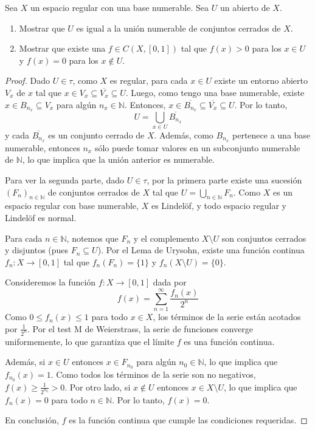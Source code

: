 \documentclass{article}
\theoremstyle{plain}
\theoremstyle{definition}
\newcommand{\N}{\mathbb{N}}
\newcommand{\cl}[1]{\overline{#1}}              %
\newenvironment{ejercicio}[1]{\begin{trivlist}
\item[\hskip \labelsep {\bfseries Ejercicio}\hskip \labelsep {\bfseries #1.}]}{\end{trivlist}}
\begin{document}
\begin{ejercicio}{5}
    Sea \( X \) un espacio regular con una base numerable. Sea \( U \) un abierto de \( X \).
    \begin{enumerate}
        \item Mostrar que \( U \) es igual a la unión numerable de conjuntos cerrados de \( X \).
        \item Mostrar que existe una \( f \in C(X, [0,1]) \) tal que \( f(x) > 0 \) para los \( x \in U \) y \( f(x) = 0 \) para los \( x \notin U \).
    \end{enumerate}
\end{ejercicio}
\begin{proof}
    Dado \( U \in \tau \), como \( X \) es regular, para cada \( x \in U \) existe un entorno abierto \( V_x \) de \( x \) tal que \( x \in V_x \subseteq \cl{V_x} \subseteq U \). Luego, como tengo una base numerable, existe \( x \in B_{n_x} \subseteq V_x \) para algún \( n_x \in \N \). Entonces, \( x \in \cl{B_{n_x}} \subseteq \cl{V_x} \subseteq U \). Por lo tanto,
    \[
        U = \bigcup_{x \in U} \cl{B_{n_x}}
    \]
    y cada \( \cl{B_{n_x}} \) es un conjunto cerrado de \( X \). Además, como \( B_{n_x} \) pertenece a una base numerable, entonces \( n_x \) sólo puede tomar valores en un subconjunto numerable de \( \N \), lo que implica que la unión anterior es numerable.

    Para ver la segunda parte, dado \( U \in \tau \), por la primera parte existe una sucesión \( {(F_n)}_{n \in \N} \) de conjuntos cerrados de \( X \) tal que \( U = \bigcup_{n \in \N} F_n \). Como \( X \) es un espacio regular con base numerable, \( X \) es Lindelöf, y todo espacio regular y Lindelöf es normal.

    Para cada \( n \in \N \), notemos que \( F_n \) y el complemento \( X \setminus U \) son conjuntos cerrados y disjuntos (pues \( F_n \subseteq U \)). Por el Lema de Urysohn, existe una función continua \( f_n : X \to [0, 1] \) tal que \( f_n(F_n) = \{1\} \) y \( f_n(X \setminus U) = \{0\} \).

    Consideremos la función \( f : X \to [0, 1] \) dada por
    \[
        f(x) = \sum_{n=1}^{\infty} \frac{f_n(x)}{2^n}
    \]
    Como \( 0 \leq f_n(x) \leq 1 \) para todo \( x \in X \), los términos de la serie están acotados por \( \frac{1}{2^n} \). Por el test M de Weierstrass, la serie de funciones converge uniformemente, lo que garantiza que el límite \( f \) es una función continua.

    Además, si \( x \in U \) entonces \( x \in F_{n_0} \) para algún \( n_0 \in \N \), lo que implica que \( f_{n_0}(x) = 1 \). Como todos los términos de la serie son no negativos, \( f(x) \geq \frac{1}{2^{n_0}} > 0 \). Por otro lado, si \( x \notin U \) entonces \( x \in X \setminus U \), lo que implica que \( f_n(x) = 0 \) para todo \( n \in \N \). Por lo tanto, \( f(x) = 0 \).

    En conclusión, \( f \) es la función continua que cumple las condiciones requeridas.
\end{proof}
\end{document}
